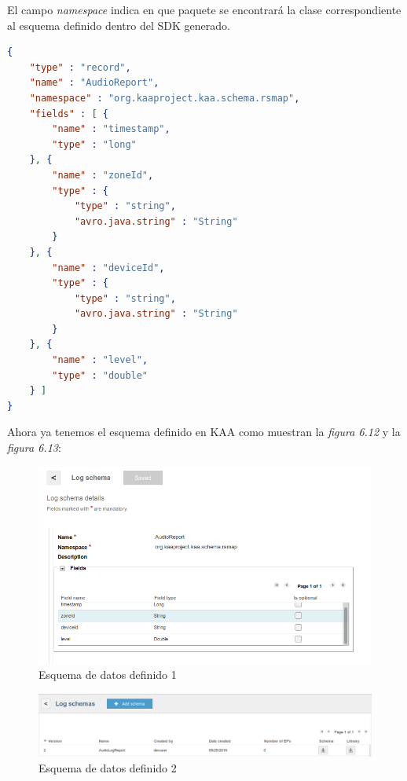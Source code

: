 \newpage

El campo \textit{namespace} indica en que paquete se encontrará la clase correspondiente al esquema definido dentro del SDK generado.

\begin{lstlisting}[language=json,caption={Esquema de datos en JSON},label={lst:json_personal}]
{
	"type" : "record",
	"name" : "AudioReport",
	"namespace" : "org.kaaproject.kaa.schema.rsmap",
	"fields" : [ {
		"name" : "timestamp",
		"type" : "long"
	}, {
		"name" : "zoneId",
		"type" : {
			"type" : "string",
			"avro.java.string" : "String"
		}
	}, {
		"name" : "deviceId",
		"type" : {
			"type" : "string",
			"avro.java.string" : "String"
		}
	}, {
		"name" : "level",
		"type" : "double"
	} ]
}
\end{lstlisting}

Ahora ya tenemos el esquema definido en KAA como muestran la \textit{figura 6.12} y la \textit{figura 6.13}:

\begin{figure}[!ht]
  \begin{center}
    \includegraphics[scale=0.45]{../images/kaa/13.png}
		\caption{Esquema de datos definido 1}
    \label{fig:kaa}
	\end{center}
\end{figure}

\begin{figure}[!ht]
  \begin{center}
    \includegraphics[scale=0.30]{../images/kaa/14.png}
		\caption{Esquema de datos definido 2}
    \label{fig:kaa}
	\end{center}
\end{figure}

